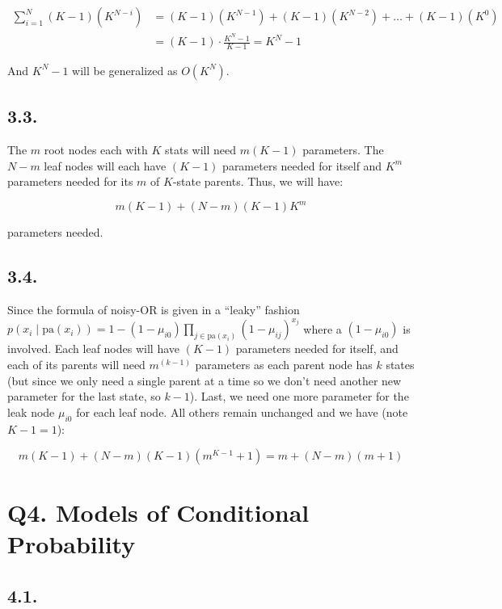\documentclass[11pt]{article}
\begin{document}
\begin{align*}
    \sum_{i = 1}^{N} (K-1)(K^{N - i}) &= (K - 1)(K^{N - 1}) + (K - 1)(K^{N - 2}) + \dots + (K - 1)(K^0) \\
    &= (K-1) \cdot \frac{K^N - 1}{K - 1} = K^N - 1
\end{align*}

And $K^N - 1$ will be generalized as $O(K^N)$.

\subsection*{3.3.}

The $m$ root nodes each with $K$ stats will need $m(K - 1)$ parameters. The $N-m$ leaf nodes will each have $(K-1)$ parameters needed for itself and $K^m$ parameters needed for its $m$ of $K$-state parents. Thus, we will have:

\begin{equation*}
    m(K - 1 ) + (N-m)(K-1)K^m
\end{equation*}

parameters needed.

\subsection*{3.4.}

Since the formula of noisy-OR is given in a ``leaky'' fashion $p(x_i \mid \textrm{pa}({x_i})) = 1 - (1 - \mu_{i0}) \prod_{j \in \textrm{pa}(x_i)}(1 - \mu_{ij})^{x_j}$ where a $(1 - \mu_{i0})$ is involved. Each leaf nodes will have $(K-1)$ parameters needed for itself, and each of its parents will need $m^(k-1)$ parameters as each parent node has $k$ states (but since we only need a single parent at a time so we don't need another new parameter for the last state, so $k-1$). Last, we need one more parameter for the leak node $\mu_{i0}$ for each leaf node. All others remain unchanged and we have (note $K - 1 = 1$):

\begin{equation*}
    m(K-1) + (N-m)(K-1)(m^{K-1} + 1)= m + (N-m)(m + 1)
\end{equation*}

\section*{Q4. Models of Conditional Probability}


\subsection*{4.1.}
\end{document}
